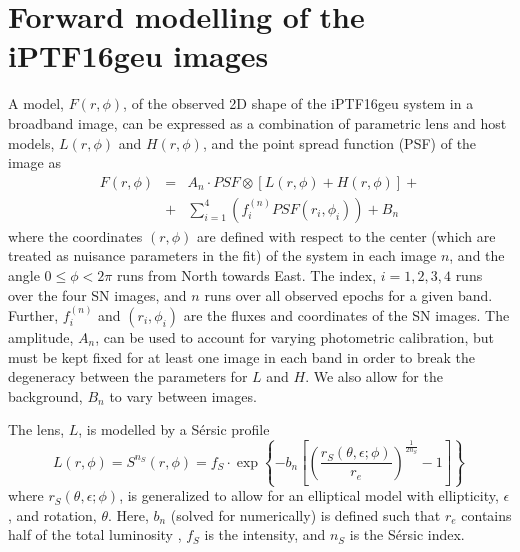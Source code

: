 \documentclass[a4paper,fleqn,usenatbib]{mnras}
\newcommand{\geu}{iPTF16geu\xspace}
\begin{document}
\section{Forward modelling of the \geu images}
\label{sec:bgmodel}
A model,  $F(r,\phi)$, of the observed 2D shape of the \geu system in a broadband image, can be expressed as a 
combination of parametric lens and host models, $L(r,\phi)$ and $H(r,\phi)$, and the point spread function (PSF) of the 
image as
\begin{eqnarray*}
	F(r,\phi) & = & A_n\cdot PSF\otimes \left[L(r,\phi) + H(r,\phi)\right] +\\
	& + & \sum\limits_{i=1}^{4}\left( f_{i}^{(n)} PSF(r_i,\phi_i) \right)+ B_n
\end{eqnarray*}
where the coordinates $(r,\phi)$ are defined with respect to the center (which are treated as nuisance parameters in the fit)
of the system in each image $n$, and the angle $0 \leq \phi < 2\pi$ runs from North towards East.  The index, $i=1,2,3,4$ runs 
over the four SN images, and $n$ runs over all observed epochs for a given band.  Further, $f_{i}^{(n)}$ and $(r_i,\phi_i)$ are 
the fluxes and coordinates of the SN images.  The amplitude, $A_n$, can be used to account for varying photometric 
calibration, but must be kept fixed for at least one image in each band in order to break the degeneracy between the  
parameters for $L$ and $H$.  We also allow for the background, $B_n$ to vary between images. 

The lens, $L$, is modelled by a S\'ersic profile \citep{1963BAAA....6...41S}
\begin{equation}
	L(r,\phi) = S^{n_S}(r,\phi) = f_S\cdot \exp\left\{-b_n\left[\left(\frac{r_S(\theta,\epsilon;\phi)}{r_e}\right)^\frac{1}{2n_S} - 1\right]\right\}\,
	\label{eq:lens}
\end{equation}
where $r_S(\theta,\epsilon;\phi)$, is generalized to allow for an elliptical model with ellipticity, $\epsilon$, and rotation, $\theta$.  Here,
$b_n$ (solved for numerically) is defined such that $r_e$ contains half of the total luminosity , $f_S$ is the intensity, and $n_S$ is
the S\'ersic index.  
\end{document}
